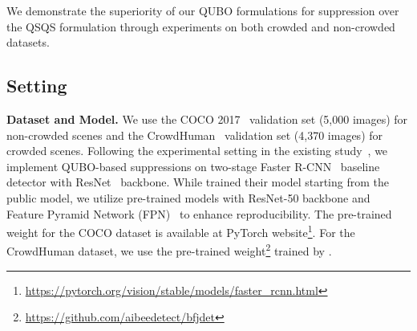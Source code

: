 We demonstrate the superiority of our QUBO formulations for suppression over the QSQS formulation through experiments on both crowded and non-crowded datasets.
\subsection{Setting}
\noindent\textbf{Dataset and Model. }
We use the COCO 2017~\cite{lin2015microsoft} validation set (5,000 images) for non-crowded scenes and the CrowdHuman~\cite{shao2018crowdhuman} validation set (4,370 images) for crowded scenes.
Following the experimental setting in the existing study~\cite{li2020qsqs}, we implement QUBO-based suppressions on two-stage Faster R-CNN~\cite{ren2015faster_r_cnn} baseline detector with ResNet~\cite{HeZRS16resnet} backbone. While \citet{li2020qsqs} trained their model starting from the public model, we utilize pre-trained models with ResNet-50 backbone and Feature Pyramid Network (FPN)~\cite{LinDGHHB17FPN} to enhance reproducibility.
The pre-trained weight for the COCO dataset is available at PyTorch website\footnote{\url{https://pytorch.org/vision/stable/models/faster_rcnn.html}}. For the CrowdHuman dataset, we use the pre-trained weight\footnote{\url{https://github.com/aibeedetect/bfjdet}} trained by \citet{Wan2021Body}.

